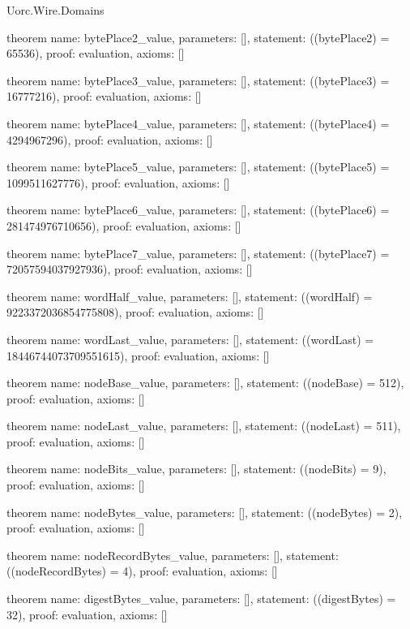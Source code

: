 \begin{lexlean}{Uorc.Wire.Domains}
\begin{semanticmodule}
theorem{
  name: bytePlace2_value,
  parameters: [],
  statement: ((bytePlace2) = 65536),
  proof: evaluation{},
  axioms: []
}

theorem{
  name: bytePlace3_value,
  parameters: [],
  statement: ((bytePlace3) = 16777216),
  proof: evaluation{},
  axioms: []
}

theorem{
  name: bytePlace4_value,
  parameters: [],
  statement: ((bytePlace4) = 4294967296),
  proof: evaluation{},
  axioms: []
}

theorem{
  name: bytePlace5_value,
  parameters: [],
  statement: ((bytePlace5) = 1099511627776),
  proof: evaluation{},
  axioms: []
}

theorem{
  name: bytePlace6_value,
  parameters: [],
  statement: ((bytePlace6) = 281474976710656),
  proof: evaluation{},
  axioms: []
}

theorem{
  name: bytePlace7_value,
  parameters: [],
  statement: ((bytePlace7) = 72057594037927936),
  proof: evaluation{},
  axioms: []
}

theorem{
  name: wordHalf_value,
  parameters: [],
  statement: ((wordHalf) = 9223372036854775808),
  proof: evaluation{},
  axioms: []
}

theorem{
  name: wordLast_value,
  parameters: [],
  statement: ((wordLast) = 18446744073709551615),
  proof: evaluation{},
  axioms: []
}

theorem{
  name: nodeBase_value,
  parameters: [],
  statement: ((nodeBase) = 512),
  proof: evaluation{},
  axioms: []
}

theorem{
  name: nodeLast_value,
  parameters: [],
  statement: ((nodeLast) = 511),
  proof: evaluation{},
  axioms: []
}

theorem{
  name: nodeBits_value,
  parameters: [],
  statement: ((nodeBits) = 9),
  proof: evaluation{},
  axioms: []
}

theorem{
  name: nodeBytes_value,
  parameters: [],
  statement: ((nodeBytes) = 2),
  proof: evaluation{},
  axioms: []
}

theorem{
  name: nodeRecordBytes_value,
  parameters: [],
  statement: ((nodeRecordBytes) = 4),
  proof: evaluation{},
  axioms: []
}

theorem{
  name: digestBytes_value,
  parameters: [],
  statement: ((digestBytes) = 32),
  proof: evaluation{},
  axioms: []
}
\end{semanticmodule}
\end{lexlean}
